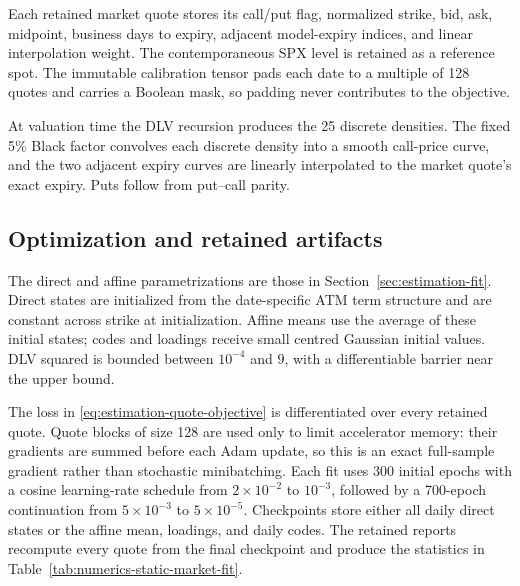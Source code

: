 Each retained market quote stores its call/put flag, normalized strike, bid,
ask, midpoint, business days to expiry, adjacent model-expiry indices, and
linear interpolation weight. The contemporaneous SPX level is retained as a
reference spot. The immutable calibration tensor pads each date to a multiple
of 128 quotes and carries a Boolean mask, so padding never contributes to the
objective.

At valuation time the DLV recursion produces the 25 discrete densities. The
fixed 5\% Black factor convolves each discrete density into a smooth call-price
curve, and the two adjacent expiry curves are linearly interpolated to the
market quote's exact expiry. Puts follow from put--call parity.

\subsection{Optimization and retained artifacts}
\label{app:pipeline-optimization}

The direct and affine parametrizations are those in
Section~\ref{sec:estimation-fit}. Direct states are initialized from the
date-specific ATM term structure and are constant across strike at
initialization. Affine means use the average of these initial states; codes and
loadings receive small centred Gaussian initial values. DLV squared is bounded
between $10^{-4}$ and $9$, with a differentiable barrier near the upper bound.

The loss in \eqref{eq:estimation-quote-objective} is differentiated over every
retained quote. Quote blocks of size 128 are used only to limit accelerator
memory: their gradients are summed before each Adam update, so this is an exact
full-sample gradient rather than stochastic minibatching. Each fit uses 300
initial epochs with a cosine learning-rate schedule from $2\times10^{-2}$ to
$10^{-3}$, followed by a 700-epoch continuation from $5\times10^{-3}$ to
$5\times10^{-5}$. Checkpoints store either all daily direct states or the
affine mean, loadings, and daily codes. The retained reports recompute every
quote from the final checkpoint and produce the statistics in
Table~\ref{tab:numerics-static-market-fit}.
